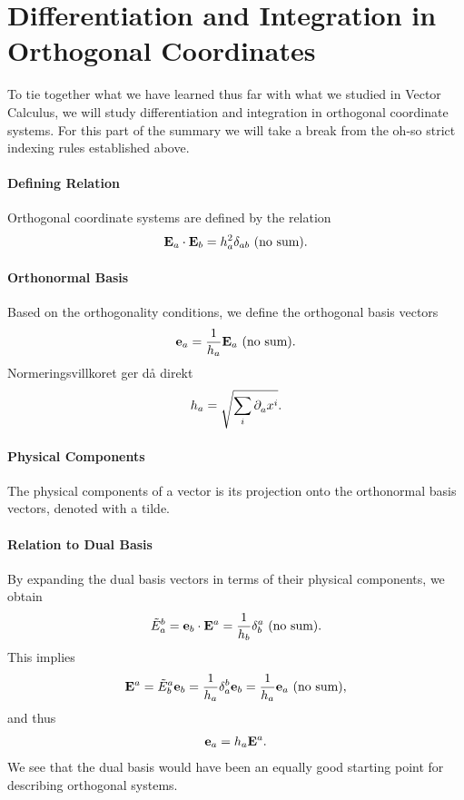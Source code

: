 \section{Differentiation and Integration in Orthogonal Coordinates}

To tie together what we have learned thus far with what we studied in Vector Calculus, we will study differentiation and integration in orthogonal coordinate systems. For this part of the summary we will take a break from the oh-so strict indexing rules established above.

\paragraph{Defining Relation}
Orthogonal coordinate systems are defined by the relation
\begin{align*}
	\vb{E}_{a}\cdot\vb{E}_{b} = h_{a}^{2}\delta_{ab}\ \text{(no sum)} .
\end{align*}

\paragraph{Orthonormal Basis}
Based on the orthogonality conditions, we define the orthogonal basis vectors
\begin{align*}
	\vb{e}_{a} = \frac{1}{h_{a}}\vb{E}_{a}\ \text{(no sum)} .
\end{align*}
Normeringsvillkoret ger då direkt
\begin{align*}
	h_{a} = \sqrt{\sum\limits_{i}\partial^{}_{a}x^{i}}.
\end{align*}

\paragraph{Physical Components}
The physical components of a vector is its projection onto the orthonormal basis vectors, denoted with a tilde.

\paragraph{Relation to Dual Basis}
By expanding the dual basis vectors in terms of their physical components, we obtain
\begin{align*}
	\tilde{E}_{a}^{b} = \vb{e}_{b}\cdot\vb{E}^{a} = \frac{1}{h_{b}}\delta_{b}^{a}\ \text{(no sum)} .
\end{align*}
This implies
\begin{align*}
	\vb{E}^{a} = \tilde{E}_{b}^{a}\vb{e}_{b} = \frac{1}{h_{a}}\delta_{a}^{b}\vb{e}_{b} = \frac{1}{h_{a}}\vb{e}_{a}\ \text{(no sum)} ,
\end{align*}
and thus
\begin{align*}
	\vb{e}_{a} = h_{a}\vb{E}^{a}.
\end{align*}
We see that the dual basis would have been an equally good starting point for describing orthogonal systems.